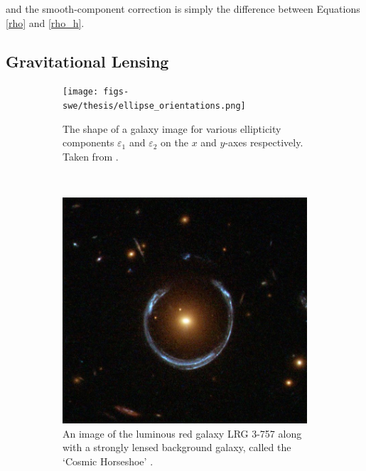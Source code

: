 \documentclass[%
 reprint,
 amsmath,amssymb,
 aps,nofootinbib
]{revtex4-1}
\begin{document}
\noindent and the smooth-component correction is simply the difference between Equations \eqref{rho} and \eqref{rho_h}.


\subsection{Gravitational Lensing} \label{grav_lensing}

\begin{figure}
    \centering
    \begin{subfigure}[H]{0.415\textwidth}
        \texttt{[image: figs-swe/thesis/ellipse\_orientations.png]}
        \captionsetup{justification=raggedright,singlelinecheck=false}
        \caption{The shape of a galaxy image for various ellipticity components $\varepsilon_1$ and $\varepsilon_2$ on the $x$ and $y$-axes respectively. Taken from \cite{schneider}.}
        \label{ellipses}
    \end{subfigure}
    ~
    \begin{subfigure}[H]{0.425\textwidth}
        \includegraphics[width=\textwidth]{figs-swe/thesis/einstein_ring.png}
        \captionsetup{justification=raggedright,singlelinecheck=false}
        \caption{An image of the luminous red galaxy LRG 3-757 along with a strongly lensed background galaxy, called the `Cosmic Horseshoe' \cite{einstein_ring}.}
        \label{einstein_ring}
    \end{subfigure}
    \caption{}
\end{figure}
\end{document}
